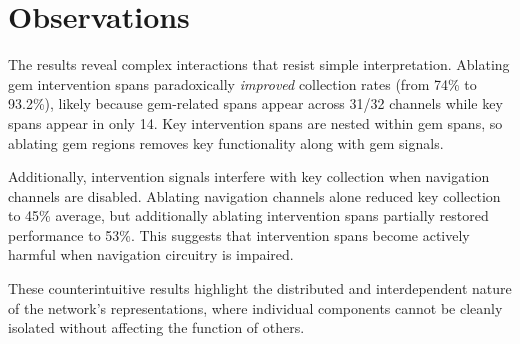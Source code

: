 \documentclass[12pt,a4paper]{report}
\begin{document}
\begin{table}[H]
    \caption[Infrastructure channel ablation effects]{Effect of ablating top 10 infrastructure channels for each entity on collection rates (n=400 trials per condition). Values shown with 95\% confidence intervals.}
    \label{tab:infrastructure_ablation_appendix}
    \centering
    \small
    \setlength{\tabcolsep}{4pt}
\end{table}

\section{Observations}

The results reveal complex interactions that resist simple interpretation. Ablating gem intervention spans paradoxically \textit{improved} collection rates (from 74\% to 93.2\%), likely because gem-related spans appear across 31/32 channels while key spans appear in only 14. Key intervention spans are nested within gem spans, so ablating gem regions removes key functionality along with gem signals.

Additionally, intervention signals interfere with key collection when navigation channels are disabled. Ablating navigation channels alone reduced key collection to 45\% average, but additionally ablating intervention spans partially restored performance to 53\%. This suggests that intervention spans become actively harmful when navigation circuitry is impaired.

These counterintuitive results highlight the distributed and interdependent nature of the network's representations, where individual components cannot be cleanly isolated without affecting the function of others.
\end{document}
